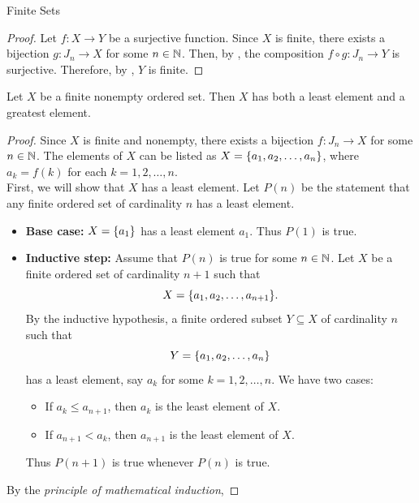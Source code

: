 \begin{section}{Finite Sets}
\begin{proof}
    Let $f: X \to Y$ be a surjective function. Since $X$ is finite, there exists a bijection $g: J_{n} \to X$
    for some $n \in \N$. Then, by , the composition $f \circ g: J_{n} \to Y$
    is surjective. Therefore, by , $Y$ is finite.
\end{proof}

\bigskip

\begin{theorem} \label{thm:FiniteOrderedSetHasExtremum}
    Let $X$ be a finite nonempty ordered set. Then $X$ has both a least element and a greatest element.
\end{theorem}

\begin{proof}
    Since $X$ is finite and nonempty, there exists a bijection $f: J_{n} \to X$ for some $n \in \N$. The elements
    of $X$ can be listed as $X = \set*{a_{1}, a_{2}, \dots, a_{n}}$, where $a_{k} = f(k)$ for each $k = 1, 2, \dots, n$.
    \\[6mm]
    First, we will show that $X$ has a least element. Let $P(n)$ be the statement that
    any finite ordered set of cardinality $n$ has a least element.
    \begin{itemize}
        \item \textbf{Base case:} $X = \set*{a_{1}}$ has a least element $a_{1}$. Thus $P(1)$ is true.
        \item \textbf{Inductive step:} Assume that $P(n)$ is true for some $n \in \N$.
        Let $X$ be a finite ordered set of cardinality $n + 1$ such that
        \[
        X = \set*{a_{1}, a_{2}, \dots, a_{n + 1}}.
        \]
        By the inductive hypothesis, a finite ordered subset $Y \subseteq X$ of cardinality $n$ such that 
        \[
        Y = \set*{a_{1}, a_{2}, \dots, a_{n}}
        \]
        has a least element, say $a_{k}$ for some $k = 1, 2, \dots, n$. We have two cases:
        \begin{itemize}
            \item If $a_{k} \leq a_{n + 1}$, then $a_{k}$ is the least element of $X$.
            \item If $a_{n + 1} < a_{k}$, then $a_{n + 1}$ is the least element of $X$.
        \end{itemize}
        Thus $P(n + 1)$ is true whenever $P(n)$ is true.
    \end{itemize}
    By the \emph{principle of mathematical induction},

\end{proof}
\end{section}
